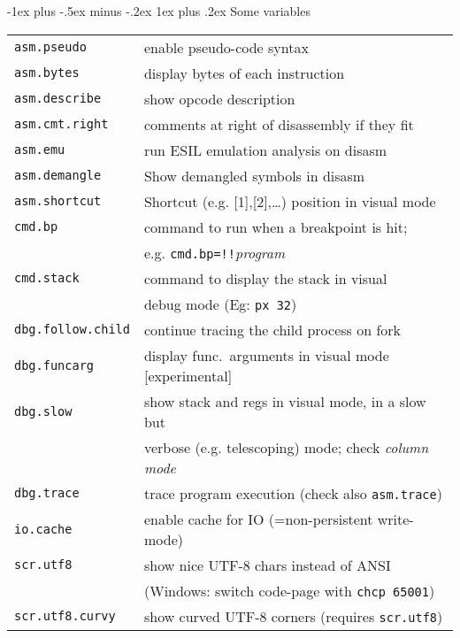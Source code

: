 \documentclass[a4paper,landscape]{article}
\makeatletter
\renewcommand{\subsubsection}{\@startsection{subsubsection}{3}{0mm}%
                                {-1ex plus -.5ex minus -.2ex}%
                                {1ex plus .2ex}%
                                {\normalfont\small\bfseries}}
\makeatother
\begin{document}
\begin{multicols*}{3}
\subsubsection{Some variables}
\begin{tabular}{@{}ll@{}}
\texttt{asm.pseudo} & enable pseudo-code syntax \\
\texttt{asm.bytes} & display bytes of each instruction \\
\texttt{asm.describe} & show opcode description \\
\texttt{asm.cmt.right} & comments at right of disassembly if they fit \\
\texttt{asm.emu} & run ESIL emulation analysis on disasm \\
\texttt{asm.demangle} & Show demangled symbols in disasm \\
\texttt{asm.shortcut} & Shortcut (e.g. [1],[2],\ldots) position in visual mode \\
\texttt{cmd.bp} & command to run when a breakpoint is hit; \\ & e.g. \texttt{cmd.bp=!!}\textit{program} \\
\texttt{cmd.stack} & command to display the stack in visual \\ & debug mode (Eg: \texttt{px 32}) \\
\texttt{dbg.follow.child} & continue tracing the child process on fork \\
\texttt{dbg.funcarg} & display func.~arguments in visual mode [experimental]\\
\texttt{dbg.slow} & show stack and regs in visual mode, in a slow but \\ & verbose (e.g. telescoping) mode; check \emph{column mode} \\
\texttt{dbg.trace} & trace program execution (check also \texttt{asm.trace}) \\
\texttt{io.cache} & enable cache for IO (=non-persistent write-mode) \\
\texttt{scr.utf8} & show nice UTF-8 chars instead of ANSI \\ & (Windows: switch code-page with \texttt{chcp 65001})\\
\texttt{scr.utf8.curvy} & show curved UTF-8 corners (requires \texttt{scr.utf8}) \\

\end{tabular}
\end{multicols*}
\end{document}
